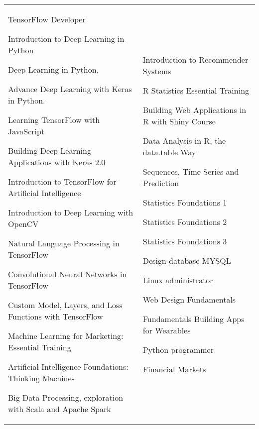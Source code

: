 
\begin{tabularx}{\textwidth}{@{}p{} X@{}}
TensorFlow Developer \par
Introduction to Deep Learning in Python\par
Deep Learning in Python,\par 
Advance Deep Learning with Keras in Python.\par
Learning TensorFlow with JavaScript\par
Building Deep Learning Applications with Keras 2.0\par
Introduction to TensorFlow for Artificial Intelligence\par
Introduction to Deep Learning with OpenCV\par


Natural Language Processing in TensorFlow\par
Convolutional Neural Networks in TensorFlow\par
Custom Model, Layers, and Loss Functions with TensorFlow\par

Machine Learning for Marketing: Essential Training\par
Artificial Intelligence Foundations: Thinking Machines\par

Big Data Processing, exploration with Scala and Apache Spark\par

&  %
Introduction to Recommender Systems\par

R Statistics Essential Training\par
Building Web Applications in R with Shiny Course\par
Data Analysis in R, the data.table Way\par
Sequences, Time Series and Prediction\par

Statistics Foundations 1\par
Statistics Foundations 2\par
Statistics Foundations 3\par
Design database MYSQL\par

Linux administrator\par
Web Design Fundamentals\par
Fundamentals Building Apps for Wearables\par
Python programmer\par
Financial Markets\par
\\
\end{tabularx}